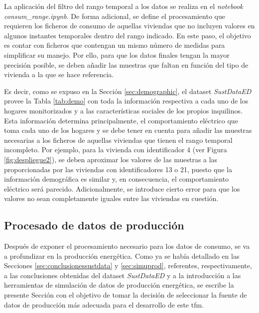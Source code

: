 \vspace{3mm}

La aplicación del filtro del rango temporal a los datos se realiza en el \textit{notebook} \textit{consum\_range.ipynb}. De forma adicional, se define el procesamiento que requieren los ficheros de consumo de aquellas viviendas que no incluyen valores en algunos instantes temporales dentro del rango indicado. En este paso, el objetivo es contar con ficheros que contengan un mismo número de medidas para simplificar su manejo. Por ello, para que los datos finales tengan la mayor precisión posible, se deben añadir las muestras que faltan en función del tipo de vivienda a la que se hace referencia. 

\vspace{3mm}

Es decir, como se expuso en la Sección \ref{sec:demographic}, el dataset \textit{SustDataED} provee la Tabla \ref{tab:demo} con toda la información respectiva a cada uno de los hogares monitorizados y a las características sociales de los propios inquilinos. Esta información determina principalmente, el comportamiento eléctrico que toma cada uno de los hogares y se debe tener en cuenta para añadir las muestras necesarias a los ficheros de aquellas viviendas que tienen el rango temporal incompleto. Por ejemplo, para la vivienda con identificador 4 (ver Figura \ref{fig:despliegue2}), se deben aproximar los valores de las muestras a las proporcionadas por las viviendas con identificadores 13 o 21, puesto que la información demográfica es similar y, en consecuencia, el comportamiento eléctrico será parecido. Adicionalmente, se introduce cierto error para que los valores no sean completamente iguales entre las viviendas en cuestión.






\subsection{Procesado de datos de producción}
\label{sec:procprod}

Después de exponer el procesamiento necesario para los datos de consumo, se va a profundizar en la producción energética. Como ya se había detallado en las Secciones \ref{sec:conclusionessustdata} y \ref{sec:simuprod},  referentes, respectivamente, a las conclusiones obtenidas del dataset \textit{SustDataED} y a la introducción a las herramientas de simulación de datos de producción energética, se escribe la presente Sección con el objetivo de tomar la decisión de seleccionar la fuente de datos de producción más adecuada para el desarrollo de este \gls{tfm}.

